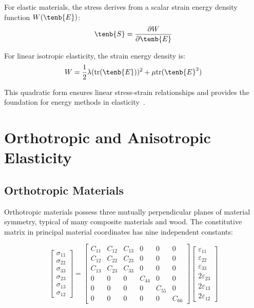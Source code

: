 For elastic materials, the stress derives from a scalar strain energy density function $W(\tenb{E})$:
\begin{equation}
\tenb{S} = \frac{\partial W}{\partial \tenb{E}}
\end{equation}

For linear isotropic elasticity, the strain energy density is:
\begin{equation}
W = \frac{1}{2}\lambda(\text{tr}(\tenb{E}))^2 + \mu \text{tr}(\tenb{E}^2)
\end{equation}

This quadratic form ensures linear stress-strain relationships and provides the foundation for energy methods in elasticity~\autocite{Sadd.2019}.

\section{Orthotropic and Anisotropic Elasticity}

\subsection{Orthotropic Materials}

Orthotropic materials possess three mutually perpendicular planes of material symmetry, typical of many composite materials and wood. The constitutive matrix in principal material coordinates has nine independent constants:

\begin{equation}
\begin{bmatrix}
\sigma_{11} \\
\sigma_{22} \\
\sigma_{33} \\
\sigma_{23} \\
\sigma_{13} \\
\sigma_{12}
\end{bmatrix}
=
\begin{bmatrix}
C_{11} & C_{12} & C_{13} & 0 & 0 & 0 \\
C_{12} & C_{22} & C_{23} & 0 & 0 & 0 \\
C_{13} & C_{23} & C_{33} & 0 & 0 & 0 \\
0 & 0 & 0 & C_{44} & 0 & 0 \\
0 & 0 & 0 & 0 & C_{55} & 0 \\
0 & 0 & 0 & 0 & 0 & C_{66}
\end{bmatrix}
\begin{bmatrix}
\varepsilon_{11} \\
\varepsilon_{22} \\
\varepsilon_{33} \\
2\varepsilon_{23} \\
2\varepsilon_{13} \\
2\varepsilon_{12}
\end{bmatrix}
\end{equation}

